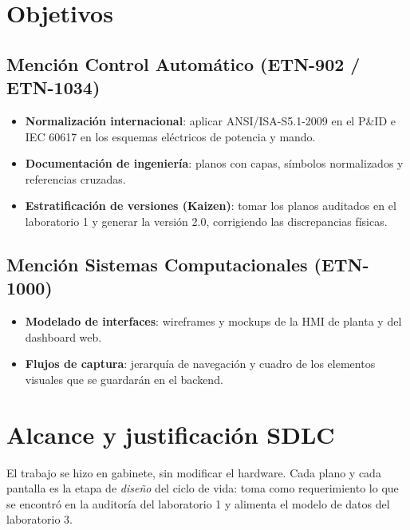 \documentclass[a4paper,11pt]{article}
\begin{document}

\tableofcontents
\newpage

\section{Objetivos}
\subsection{Mención Control Automático (ETN-902 / ETN-1034)}
\begin{itemize}
\item \textbf{Normalización internacional}: aplicar ANSI/ISA-S5.1-2009 en el P\&ID e IEC 60617 en los esquemas eléctricos de potencia y mando.
\item \textbf{Documentación de ingeniería}: planos con capas, símbolos normalizados y referencias cruzadas.
\item \textbf{Estratificación de versiones (Kaizen)}: tomar los planos auditados en el laboratorio 1 y generar la versión 2.0, corrigiendo las discrepancias físicas.
\end{itemize}
\subsection{Mención Sistemas Computacionales (ETN-1000)}
\begin{itemize}
\item \textbf{Modelado de interfaces}: wireframes y mockups de la HMI de planta y del dashboard web.
\item \textbf{Flujos de captura}: jerarquía de navegación y cuadro de los elementos visuales que se guardarán en el backend.
\end{itemize}

\section{Alcance y justificación SDLC}
El trabajo se hizo en gabinete, sin modificar el hardware. Cada plano y cada pantalla es la etapa de \emph{diseño} del ciclo de vida: toma como requerimiento lo que se encontró en la auditoría del laboratorio 1 y alimenta el modelo de datos del laboratorio 3.
\end{document}
